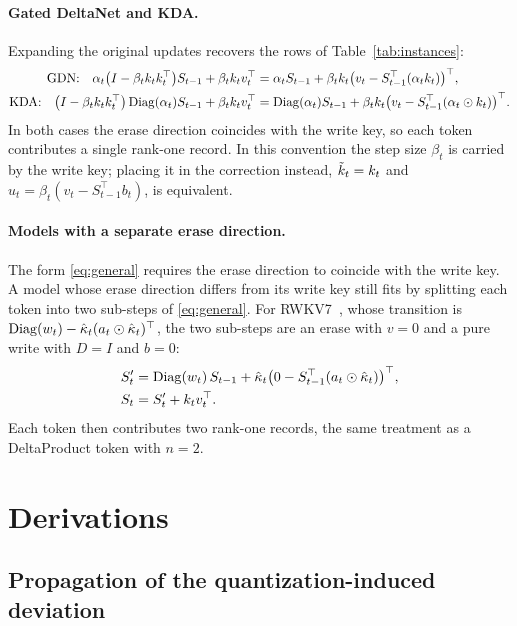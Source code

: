 \paragraph{Gated DeltaNet and KDA.}
Expanding the original updates recovers the rows of Table~\ref{tab:instances}:
\begin{align*}
  \text{GDN:}\quad
  \alpha_t\bigl(I-\beta_tk_tk_t^{\top}\bigr)S_{t-1}+\beta_tk_tv_t^{\top}
  &= \alpha_tS_{t-1} + \beta_tk_t\bigl(v_t - S_{t-1}^{\top}(\alpha_tk_t)\bigr)^{\top},\\
  \text{KDA:}\quad
  \bigl(I-\beta_tk_tk_t^{\top}\bigr)\operatorname{Diag}(\alpha_t)S_{t-1}+\beta_tk_tv_t^{\top}
  &= \operatorname{Diag}(\alpha_t)S_{t-1} + \beta_tk_t\bigl(v_t - S_{t-1}^{\top}(\alpha_t\odot k_t)\bigr)^{\top}.
\end{align*}
In both cases the erase direction coincides with the write key, so each token contributes a single rank-one record.
In this convention the step size $\beta_t$ is carried by the write key; placing it in the correction instead, $\tilde{k}_t=k_t$ and $u_t=\beta_t(v_t-S_{t-1}^{\top}b_t)$, is equivalent.

\paragraph{Models with a separate erase direction.}
The form \eqref{eq:general} requires the erase direction to coincide with the write key.
A model whose erase direction differs from its write key still fits by splitting each token into two sub-steps of \eqref{eq:general}.
For RWKV7~\citep{peng2025rwkv}, whose transition is $\operatorname{Diag}(w_t)-\hat{\kappa}_t(a_t\odot\hat{\kappa}_t)^{\top}$, the two sub-steps are an erase with $v=0$ and a pure write with $D=I$ and $b=0$:
\begin{align*}
  S_t' &= \operatorname{Diag}(w_t)\,S_{t-1} + \hat{\kappa}_t\bigl(0 - S_{t-1}^{\top}(a_t\odot\hat{\kappa}_t)\bigr)^{\top},\\
  S_t &= S_t' + k_t v_t^{\top}.
\end{align*}
Each token then contributes two rank-one records, the same treatment as a DeltaProduct token with $n=2$.

\section{Derivations}
\label{app:derivations}

\subsection{Propagation of the quantization-induced deviation}
\label{app:deviation}

